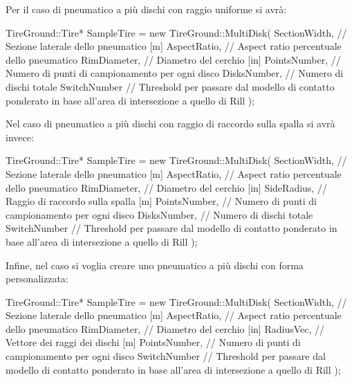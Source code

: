 Per il caso di pneumatico a più dischi con raggio uniforme si avrà:
\begin{pseudoc}
	TireGround::Tire* SampleTire = new TireGround::MultiDisk(
		SectionWidth, // Sezione laterale dello pneumatico [m]
		AspectRatio,  // Aspect ratio percentuale dello pneumatico
		RimDiameter,  // Diametro del cerchio [in]
		PointsNumber, // Numero di punti di campionamento per ogni disco
		DisksNumber,  // Numero di dischi totale
		SwitchNumber  // Threshold per passare dal modello di contatto ponderato in base all'area di intersezione a quello di Rill 
		);
\end{pseudoc}
Nel caso di pneumatico a più dischi con raggio di raccordo sulla spalla si avrà invece:
\begin{pseudoc}
	TireGround::Tire* SampleTire = new TireGround::MultiDisk(
		SectionWidth, // Sezione laterale dello pneumatico [m]
		AspectRatio,  // Aspect ratio percentuale dello pneumatico
		RimDiameter,  // Diametro del cerchio [in]
		SideRadius,   // Raggio di raccordo sulla spalla [m]
		PointsNumber, // Numero di punti di campionamento per ogni disco
		DisksNumber,  // Numero di dischi totale
		SwitchNumber  // Threshold per passare dal modello di contatto ponderato in base all'area di intersezione a quello di Rill 
		);
\end{pseudoc}
Infine, nel caso si voglia creare uno pneumatico a più dischi con forma personalizzata:
\begin{pseudoc}
	TireGround::Tire* SampleTire = new TireGround::MultiDisk(
		SectionWidth, // Sezione laterale dello pneumatico [m]
		AspectRatio,  // Aspect ratio percentuale dello pneumatico
		RimDiameter,  // Diametro del cerchio [in]
		RadiusVec,    // Vettore dei raggi dei dischi [m]
		PointsNumber, // Numero di punti di campionamento per ogni disco
		SwitchNumber  // Threshold per passare dal modello di contatto ponderato in base all'area di intersezione a quello di Rill 
		);
\end{pseudoc}
%
